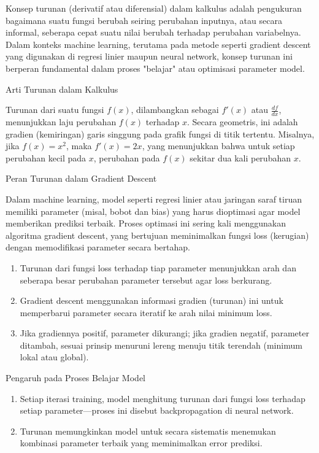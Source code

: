 \documentclass[a4paper]{article}
\begin{document}
\begin{enumerate}[itemsep=1em,leftmargin=*]
  Konsep turunan (derivatif atau diferensial) dalam kalkulus adalah pengukuran bagaimana suatu fungsi berubah seiring perubahan inputnya, atau secara informal, seberapa cepat suatu nilai berubah terhadap perubahan variabelnya. Dalam konteks machine learning, terutama pada metode seperti gradient descent yang digunakan di regresi linier maupun neural network, konsep turunan ini berperan fundamental dalam proses "belajar" atau optimisasi parameter model.

  Arti Turunan dalam Kalkulus

  Turunan dari suatu fungsi $f(x)$, dilambangkan sebagai $f'(x)$ atau $\frac{df}{dx}$, menunjukkan laju perubahan $f(x)$ terhadap $x$. Secara geometris, ini adalah gradien (kemiringan) garis singgung pada grafik fungsi di titik tertentu. Misalnya, jika $f(x) = x^2$, maka $f'(x) = 2x$, yang menunjukkan bahwa untuk setiap perubahan kecil pada $x$, perubahan pada $f(x)$ sekitar dua kali perubahan $x$.

  Peran Turunan dalam Gradient Descent

  Dalam machine learning, model seperti regresi linier atau jaringan saraf tiruan memiliki parameter (misal, bobot dan bias) yang harus dioptimasi agar model memberikan prediksi terbaik. Proses optimasi ini sering kali menggunakan algoritma gradient descent, yang bertujuan meminimalkan fungsi loss (kerugian) dengan memodifikasi parameter secara bertahap.

  \begin{enumerate}
    \item Turunan dari fungsi loss terhadap tiap parameter menunjukkan arah dan seberapa besar perubahan parameter tersebut agar loss berkurang.
    \item Gradient descent menggunakan informasi gradien (turunan) ini untuk memperbarui parameter secara iteratif ke arah nilai minimum loss.
    \item Jika gradiennya positif, parameter dikurangi; jika gradien negatif, parameter ditambah, sesuai prinsip menuruni lereng menuju titik terendah (minimum lokal atau global).
  \end{enumerate}

  Pengaruh pada Proses Belajar Model

  \begin{enumerate}
    \item Setiap iterasi training, model menghitung turunan dari fungsi loss terhadap setiap parameter—proses ini disebut backpropagation di neural network.
    \item Turunan memungkinkan model untuk secara sistematis menemukan kombinasi parameter terbaik yang meminimalkan error prediksi.
  \end{enumerate}


\end{enumerate}
\end{document}
